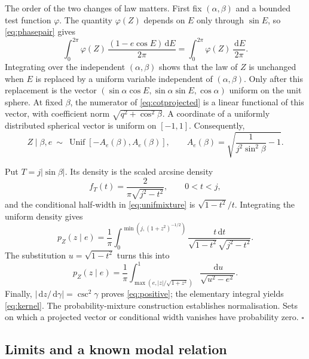 \documentclass[11pt,a4paper]{article}
\theoremstyle{remark}\newtheorem{remark}[theorem]{Remark}
\newcommand{\dd}{\,\mathrm d}
\begin{document}
The order of the two changes of law matters. First fix $(\alpha,\beta)$ and a bounded test function $\varphi$. The quantity $\varphi(Z)$ depends on $E$ only through $\sin E$, so \eqref{eq:phasepair} gives
\begin{equation}
\int_0^{2\pi}\varphi(Z)\,\frac{(1-e\cos E)\dd E}{2\pi}=\int_0^{2\pi}\varphi(Z)\,\frac{\dd E}{2\pi}.
\end{equation}
Integrating over the independent $(\alpha,\beta)$ shows that the law of $Z$ is unchanged when $E$ is replaced by a uniform variable independent of $(\alpha,\beta)$. Only after this replacement is the vector
$(\sin\alpha\cos E,\sin\alpha\sin E,\cos\alpha)$ uniform on the unit sphere. At fixed $\beta$, the numerator of \eqref{eq:cotprojected} is a linear functional of this vector, with coefficient norm $\sqrt{q^2+\cos^2\beta}$. A coordinate of a uniformly distributed spherical vector is uniform on $[-1,1]$. Consequently,
\begin{equation}\label{eq:unifmixture}
Z\mid\beta,e\ \sim\ \operatorname{Unif}[-A_e(\beta),A_e(\beta)],
\qquad A_e(\beta)=\sqrt{\frac{1}{j^2\sin^2\beta}-1}.
\end{equation}

Put $T=j|\sin\beta|$. Its density is the scaled arcsine density
\begin{equation}
f_T(t)=\frac{2}{\pi\sqrt{j^2-t^2}},\qquad 0<t<j,
\end{equation}
and the conditional half-width in \eqref{eq:unifmixture} is $\sqrt{1-t^2}/t$. Integrating the uniform density gives
\begin{equation}
p_Z(z\mid e)=\frac{1}{\pi}
\int_0^{\min(j,(1+z^2)^{-1/2})}
\frac{t\dd t}{\sqrt{1-t^2}\sqrt{j^2-t^2}}.
\end{equation}
The substitution $u=\sqrt{1-t^2}$ turns this into
\begin{equation}
p_Z(z\mid e)=\frac{1}{\pi}
\int_{\max(e,|z|/\sqrt{1+z^2})}^1\frac{\dd u}{\sqrt{u^2-e^2}}.
\end{equation}
Finally, $|\dd z/\dd\gamma|=\csc^2\gamma$ proves \eqref{eq:positive}; the elementary integral yields \eqref{eq:kernel}. The probability-mixture construction establishes normalisation. Sets on which a projected vector or conditional width vanishes have probability zero. \hfill$\square$

\subsection{Limits and a known modal relation}
\end{document}
